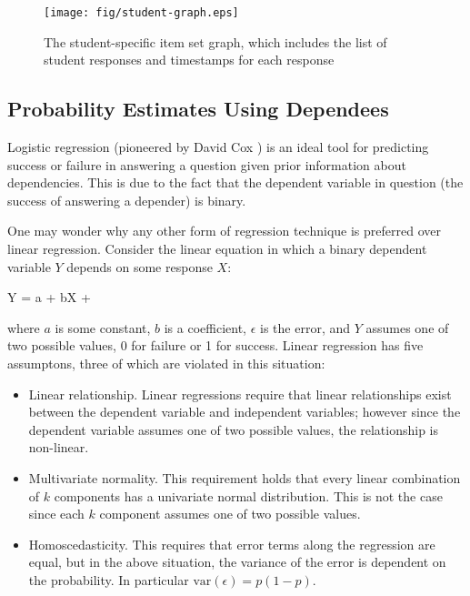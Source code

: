 \begin{figure}[!p]
\label{fig:student-graph}
  \centering\texttt{[image: fig/student-graph.eps]}
\caption{The student-specific item set graph, which includes the list of
student responses and timestamps for each response}
\end{figure}

\subsection{Probability Estimates Using Dependees}
\label{sec:propest}

Logistic regression (pioneered by David Cox \cite{cox1958regression}) is an
ideal tool for predicting success or failure in answering a question given
prior information about dependencies.  This is due to the fact that the
dependent variable in question (the success of answering a depender) is binary.  

One may wonder why any other form of regression technique is preferred over
linear regression.  Consider the linear equation in which a binary dependent
variable $Y$ depends on some response $X$:

\begin{equations}
         Y = a + bX + \epsilon
\end{equations}

where $a$ is some constant, $b$ is a coefficient, $\epsilon$ is the error, and
$Y$ assumes one of two possible values, 0 for failure or 1 for success.  Linear
regression has five assumptons, three of which are violated in this situation:

\begin{itemize}

  \item Linear relationship. Linear regressions require that linear
  relationships exist between the dependent variable and independent variables;
  however since the dependent variable assumes one of two possible values, the
  relationship is non-linear.

  \item Multivariate normality. This requirement holds that every linear
  combination of $k$ components has a univariate normal distribution.  This
  is not the case since each $k$ component assumes one of two possible values.

  \item Homoscedasticity. This requires that error terms along the regression
  are equal, but in the above situation, the variance of the error is dependent
  on the probability.   In particular $\mathrm{var}(\epsilon) = p(1-p)$.

\end{itemize} 

